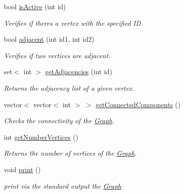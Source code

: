 \begin{DoxyCompactItemize}
bool \hyperlink{classGraph_a7ef34e66297418bbc2aa3ee80ab5c922}{is\+Active} (int id)
\begin{DoxyCompactList}\small\item\em Verifies if there\textquotesingle{}s a vertex with the specified ID. \end{DoxyCompactList}\item 
bool \hyperlink{classGraph_a6d50028c1549bf475a3042709c013174}{adjacent} (int id1, int id2)
\begin{DoxyCompactList}\small\item\em Verifies if two vertices are adjacent. \end{DoxyCompactList}\item 
set$<$ int $>$ \hyperlink{classGraph_abe4de4c0e093b910c8bdfe6dd2073fd3}{get\+Adjacencies} (int id)
\begin{DoxyCompactList}\small\item\em Returns the adjacency list of a given vertex. \end{DoxyCompactList}\item 
vector$<$ vector$<$ int $>$ $>$ \hyperlink{classGraph_aa2609fca5b449849d67ed7a20bf05107}{get\+Connected\+Components} ()
\begin{DoxyCompactList}\small\item\em Checks the connectivity of the \hyperlink{classGraph}{Graph}. \end{DoxyCompactList}\item 
int \hyperlink{classGraph_a37480eba273bdc76a05ee24633830000}{get\+Number\+Vertices} ()
\begin{DoxyCompactList}\small\item\em Returns the number of vertices of the \hyperlink{classGraph}{Graph}. \end{DoxyCompactList}\item 
\mbox{\label{classGraph_a2ecf3dd3c4897aa924da8e5c221a8509}} 
void \hyperlink{classGraph_a2ecf3dd3c4897aa924da8e5c221a8509}{print} ()
\begin{DoxyCompactList}\small\item\em print via the standard output the \hyperlink{classGraph}{Graph} \end{DoxyCompactList}\end{DoxyCompactItemize}
